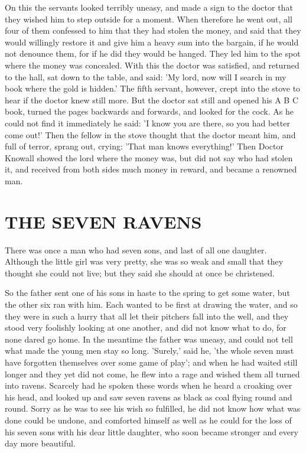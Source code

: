 \documentclass[12pt]{book}
\begin{document}
On this the servants looked terribly uneasy, and made a sign to the
doctor that they wished him to step outside for a moment. When
therefore he went out, all four of them confessed to him that they had
stolen the money, and said that they would willingly restore it and
give him a heavy sum into the bargain, if he would not denounce them,
for if he did they would be hanged. They led him to the spot where the
money was concealed. With this the doctor was satisfied, and returned
to the hall, sat down to the table, and said: 'My lord, now will I
search in my book where the gold is hidden.' The fifth servant,
however, crept into the stove to hear if the doctor knew still more.
But the doctor sat still and opened his A B C book, turned the pages
backwards and forwards, and looked for the cock. As he could not find
it immediately he said: 'I know you are there, so you had better come
out!' Then the fellow in the stove thought that the doctor meant him,
and full of terror, sprang out, crying: 'That man knows everything!'
Then Doctor Knowall showed the lord where the money was, but did not
say who had stolen it, and received from both sides much money in
reward, and became a renowned man.



\chapter{THE SEVEN RAVENS}

There was once a man who had seven sons, and last of all one daughter.
Although the little girl was very pretty, she was so weak and small
that they thought she could not live; but they said she should at once
be christened.

So the father sent one of his sons in haste to the spring to get some
water, but the other six ran with him. Each wanted to be first at
drawing the water, and so they were in such a hurry that all let their
pitchers fall into the well, and they stood very foolishly looking at
one another, and did not know what to do, for none dared go home. In
the meantime the father was uneasy, and could not tell what made the
young men stay so long. 'Surely,' said he, 'the whole seven must have
forgotten themselves over some game of play'; and when he had waited
still longer and they yet did not come, he flew into a rage and wished
them all turned into ravens. Scarcely had he spoken these words when
he heard a croaking over his head, and looked up and saw seven ravens
as black as coal flying round and round. Sorry as he was to see his
wish so fulfilled, he did not know how what was done could be undone,
and comforted himself as well as he could for the loss of his seven
sons with his dear little daughter, who soon became stronger and every
day more beautiful.
\end{document}
